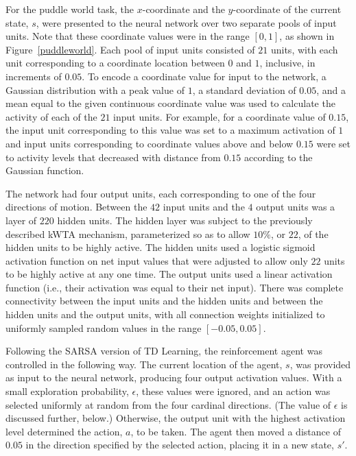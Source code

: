 \documentclass[preprint,12pt,authoryear]{elsarticle}
\begin{document}
For the puddle world task, the $x$-coordinate and the $y$-coordinate
of the current state, $s$, were presented to the neural network over
two separate pools of input units. Note that these coordinate values
were in the range $[0,1]$, as shown in Figure~\ref{puddleworld}. Each
pool of input units consisted of $21$ units, with each unit
corresponding to a coordinate location between $0$ and $1$, inclusive,
in increments of $0.05$. To encode a coordinate value for input to the
network, a Gaussian distribution with a peak value of $1$, a standard
deviation of $0.05$, and a mean equal to the given continuous
coordinate value was used to calculate the activity of each of
the $21$ input units. For example, for a coordinate value
of $0.15$, the input unit corresponding to this value was set to a
maximum activation of $1$ and input units corresponding to coordinate
values above and below $0.15$ were set to activity levels that
decreased with distance from $0.15$ according to the Gaussian
function.

The network had four output units, each corresponding to one of the
four directions of motion. Between the $42$ input units and the $4$
output units was a layer of $220$ hidden units. The hidden layer was
subject to the previously described kWTA mechanism, parameterized so
as to allow $10\%$, or $22$, of the hidden units to be highly active.
The hidden units used a logistic sigmoid activation function on net
input values that were adjusted to allow only $22$ units to be highly
active at any one time. The output units used a linear activation
function (i.e., their activation was equal to their net input). There
was complete connectivity between the input units and the hidden units
and between the hidden units and the output units, with all connection
weights initialized to uniformly sampled random values in the range
$[-0.05,0.05]$.




Following the SARSA version of TD Learning, the reinforcement agent
was controlled in the following way. The current location of the
agent, $s$, was provided as input to the neural network, producing
four output activation values. With a small exploration probability,
$\epsilon$, these values were ignored, and an action was selected
uniformly at random from the four cardinal directions. (The value of
$\epsilon$ is discussed further, below.) Otherwise, the output unit
with the highest activation level determined the action, $a$, to be
taken. The agent then moved a distance of $0.05$ in the direction
specified by the selected action, placing it in a new state, $s'$.
\end{document}
